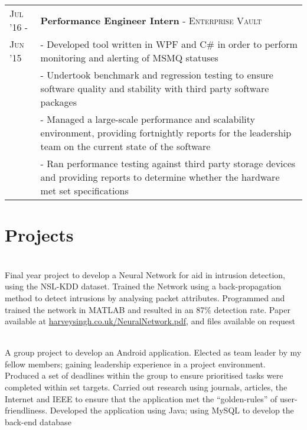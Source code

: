 \documentclass[a4paper,10pt]{extarticle} %
\begin{document}
{\begin{tabularx}{\linewidth}{ l | X }
\textsc{Jul '16 -} & \textbf{Performance Engineer Intern} \textsc{- Enterprise Vault}\hfill\\
\textsc{Jun '15}
& {- Developed tool written in WPF and C\# in order to perform monitoring and alerting of MSMQ statuses}\\
& {- Undertook benchmark and regression testing to ensure software quality and stability with third party software packages}\\
& {- Managed a large-scale performance and scalability environment, providing fortnightly reports for the leadership team on the current state of the software}\\
& {- Ran performance testing against third party storage devices and providing reports to determine whether the hardware met set specifications}\\


\end{tabularx}




\section{\textcolor{primary}{Projects}}
\vspace{0.1cm}
\begin{description}
\sloppy
\item[Artificial Neural Network for Intrusion Detection]\hfill \\
Final year project to develop a Neural Network for aid in intrusion detection, using the NSL-KDD dataset. Trained the Network using a back-propagation method to detect intrusions by analysing packet attributes. Programmed and trained the network in MATLAB and resulted in an 87\% detection rate. Paper available at \href{http://harveysingh.co.uk/NeuralNetwork.pdf}{harveysingh.co.uk/NeuralNetwork.pdf}, and files available on request

\item[Android Application Development]\hfill \\
A group project to develop an Android application. Elected as team leader by my fellow members; gaining leadership experience in a project environment. Produced a set of deadlines within the group to ensure prioritised tasks were completed within set targets. Carried out research using journals, articles, the Internet and IEEE to ensure that the application met the “golden-rules” of user-friendliness. Developed the application using Java; using MySQL to develop the back-end database


\end{description}}
\end{document}
